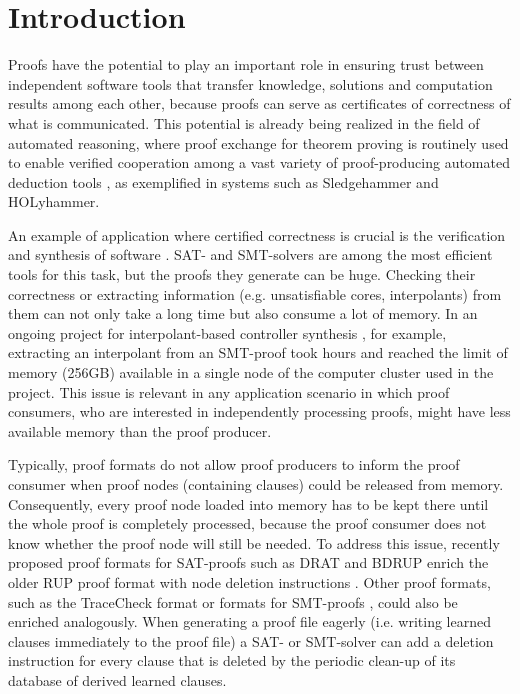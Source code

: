 \section{Introduction}

Proofs have the potential to play an important role in ensuring trust
between independent software tools that transfer knowledge, solutions
and computation results among each other, because proofs can serve as
certificates of correctness of what is communicated. This potential is
already being realized in the field of automated reasoning, where
proof exchange for theorem proving
\cite{ToDo:PxTPInformalWorkshopProceedings} is routinely used to
enable verified cooperation among a vast variety of proof-producing
automated deduction tools \cite{APPA}, as exemplified in systems such
as Sledgehammer \cite{ToDo:Sledgehammer} and
HOLyhammer\cite{ToDo:HOLyhammer}. 

An example of application where certified correctness is crucial is the verification and synthesis of software \cite{Biere2009,Hofferek2013}. SAT- and SMT-solvers are among the most efficient tools for this task, but the proofs they generate can be huge. 
Checking their correctness or extracting information (e.g. unsatisfiable cores, interpolants) from them can not only take a long time but also consume a lot of memory. 
In an ongoing project for interpolant-based controller synthesis \cite{Hofferek2013}, 
for example, extracting an interpolant from an SMT-proof took hours and reached the limit of memory (256GB) available in a single node of the computer cluster used in the project. This issue is relevant in any application scenario in which proof consumers, who are interested in independently processing proofs, might have less available memory than the proof producer.

Typically, proof formats do not allow proof producers to inform the proof consumer when proof nodes (containing clauses) could be released from memory. Consequently, every proof node loaded into memory has to be kept there until the whole proof is completely processed, because the proof consumer does not know whether the proof node will still be needed. To address this issue, recently proposed proof formats for SAT-proofs such as DRAT and BDRUP enrich the older RUP proof format with node deletion instructions \cite{raey}. Other proof formats, such as the TraceCheck format \cite{BiereHeuleAPPA} or formats for SMT-proofs \cite{BarrettFontaineMouraAPPA}, could also be enriched analogously. When generating a proof file eagerly (i.e. writing learned clauses immediately to the proof file) a SAT- or SMT-solver can add a deletion instruction for every clause that is deleted by the periodic clean-up of its database of derived learned clauses.

